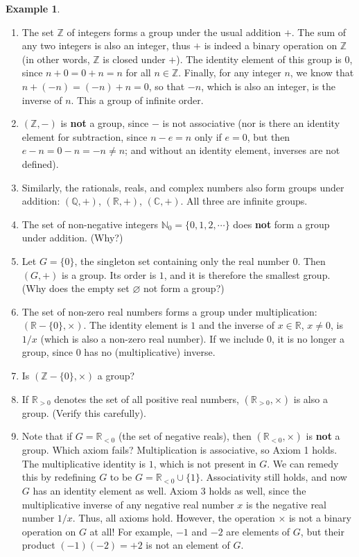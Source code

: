 \documentclass[svgnames]{article}
\theoremstyle{definition}
\newtheorem{Example}[Theorem]{Example}
\theoremstyle{remark}
\begin{document}
\begin{Example}\label{ex:Groups}
\begin{enumerate}
\item The set $\mathbb Z$ of integers forms a group under the usual addition $+$. The sum of any two integers is also an integer, thus $+$ is indeed a binary operation on $\mathbb Z$ (in other words, $\mathbb Z$ is closed under $+$). The identity element of this group is $0$, since $n + 0 = 0 + n = n$ for all $n \in \mathbb Z$. Finally, for any integer $n$, we know that $n + (-n) = (-n) + n = 0$, so that $-n$, which is also an integer, is the inverse of $n$. This a group of infinite order.
\item $(\mathbb Z, -)$ is \textbf{not} a group, since $-$ is not associative (nor is there an identity element for subtraction, since $n - e = n$ only if $e = 0$, but then $e - n = 0 - n = -n \ne n$; and without an identity element, inverses are not defined).
\item Similarly, the rationals, reals, and complex numbers also form groups under addition: $(\mathbb Q, +)$, $(\mathbb R, +)$, $(\mathbb C, +)$. All three are infinite groups.
\item The set of non-negative integers $\mathbb N_0 = \{0, 1, 2, \cdots\}$ does \textbf{not} form a group under addition. (Why?)
\item Let $G = \{0\}$, the singleton set containing only the real number $0$. Then $(G, +)$ is a group. Its order is $1$, and it is therefore the smallest group. (Why does the empty set $\varnothing$ not form a group?)
\item The set of non-zero real numbers forms a group under multiplication: $(\mathbb R - \{0\}, \times)$. The identity element is $1$ and the inverse of $x \in \mathbb R$, $x \ne 0$, is $1/x$ (which is also a non-zero real number). If we include $0$, it is no longer a group, since $0$ has no (multiplicative) inverse.
\item Is $(\mathbb Z - \{0\}, \times)$ a group?
\item If $\mathbb R_{>0}$ denotes the set of all positive real numbers, $(\mathbb R_{>0}, \times)$ is also a group. (Verify this carefully).
\item Note that if $G = \mathbb R_{<0}$ (the set of negative reals), then $(\mathbb R_{<0}, \times)$ is \textbf{not} a group. Which axiom fails? Multiplication is associative, so Axiom 1 holds. The multiplicative identity is $1$, which is not present in $G$. We can remedy this by redefining $G$ to be $G = \mathbb R_{<0} \cup \{1\}$. Associativity still holds, and now $G$ has an identity element as well. Axiom 3 holds as well, since the multiplicative inverse of any negative real number $x$ is the negative real number $1/x$. Thus, all axioms hold. However, the operation $\times$ is not a binary operation on $G$ at all! For example, $-1$ and $-2$ are elements of $G$, but their product $(-1)(-2) = +2$ is not an element of $G$.

\end{enumerate}
\end{Example}
\end{document}
